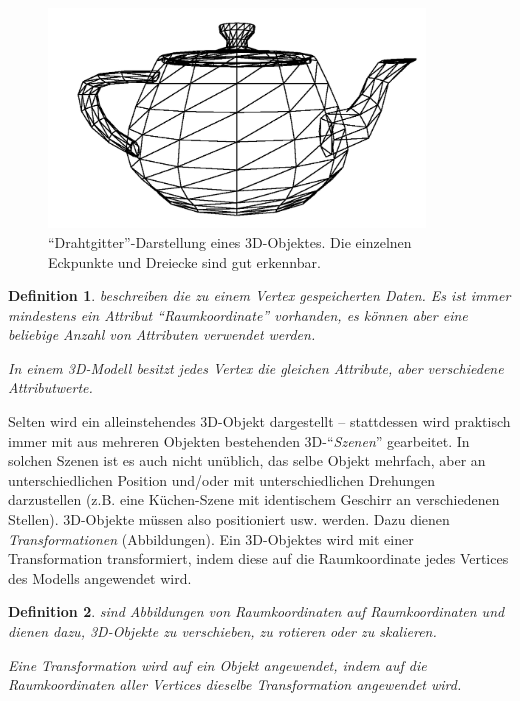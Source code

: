 \documentclass[twoside,a4paper,fleqn,12pt]{book}
\newtheorem{defn}{Definition}
\begin{document}
\begin{figure}[h]
  \centering
  \includegraphics[width=10cm]{mesh_wireframe_thick}
  \caption{"`Drahtgitter"'-Darstellung eines 3D-Objektes. Die einzelnen Eckpunkte und Dreiecke sind gut erkennbar.}
  \label{fig:wireframe_teapot}
\end{figure}

\begin{defn}
 beschreiben die zu einem Vertex gespeicherten Daten. Es ist immer mindestens
ein Attribut "`Raumkoordinate"' vorhanden, es können aber eine beliebige Anzahl von Attributen verwendet werden.

In einem 3D-Modell besitzt jedes Vertex die gleichen Attribute, aber verschiedene Attribut\emph{werte}.
\end{defn}

Selten wird ein alleinstehendes 3D-Objekt dargestellt -- stattdessen wird praktisch immer mit aus mehreren Objekten
bestehenden 3D-"`\emph{Szenen}"' gearbeitet. In solchen Szenen ist es auch nicht unüblich, das selbe Objekt mehrfach,
aber an unterschiedlichen Position \mbox{und/oder} mit unterschiedlichen Drehungen darzustellen (z.B. eine Küchen-Szene mit identischem
Geschirr an verschiedenen Stellen). 3D-Objekte müssen also positioniert usw. werden. Dazu dienen \emph{Transformationen}
(Abbildungen). Ein 3D-Objektes wird mit einer Transformation transformiert, indem diese auf die Raumkoordinate jedes Vertices
des Modells angewendet wird.

\begin{defn}
 sind Abbildungen von Raumkoordinaten auf Raumkoordinaten und dienen dazu,
3D-Objekte zu verschieben, zu rotieren oder zu skalieren.

Eine Transformation wird auf ein Objekt angewendet, indem auf die Raumkoordinaten aller Vertices dieselbe Transformation angewendet wird.
\end{defn}
\end{document}
